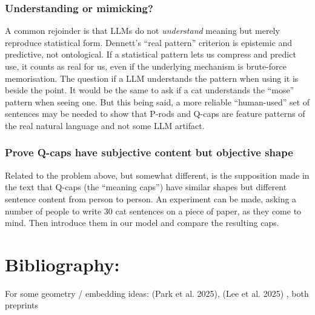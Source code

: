 \documentclass[12pt]{article}
\begin{document}
\subsubsection{Understanding or mimicking?}\label{understanding-or-mimicking}

A common rejoinder is that LLMs do not \emph{understand} meaning but merely reproduce statistical form. Dennett's ``real pattern'' criterion is epistemic and predictive, not ontological. If a statistical pattern lets us compress and predict use, it counts as real for us, even if the underlying mechanism is brute-force memorisation. The question if a LLM understands the pattern when using it is beside the point. It would be the same to ask if a cat understands the ``mose'' pattern when seeing one. But this being said, a more reliable ``human-used'' set of sentences may be needed to show that P-rods and Q-caps are feature patterns of the real natural language and not some LLM artifact.

\subsubsection{Prove Q-caps have subjective content but objective shape}\label{prove-q-caps-have-subjective-content-but-objective-shape}

Related to the problem above, but somewhat different, is the supposition made in the text that Q-caps (the ``meaning caps'') have similar shapes but different sentence content from person to person. An experiment can be made, asking a number of people to write 30 cat sentences on a piece of paper, as they come to mind. Then introduce them in our model and compare the resulting caps.

\section{Bibliography:}\label{bibliography}

For some geometry / embedding ideas: (Park et al. 2025), (Lee et al. 2025) , both preprints
\end{document}
